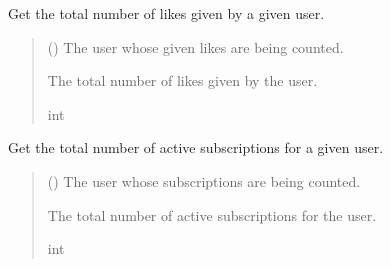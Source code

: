\documentclass[letterpaper,10pt,english]{sphinxmanual}
\begin{document}

\begin{fulllineitems}
\label{\detokenize{modules/others:account.helpers.get_total_likes_given}}
\pysigstartsignatures
{}
\pysigstopsignatures
\sphinxAtStartPar
Get the total number of likes given by a given user.
\begin{quote}\begin{description}
\sphinxAtStartPar
{} ({\hyperref[\detokenize{modules/models:account.models.CustomUser}]{}}) \textendash{} The user whose given likes are being counted.

\sphinxAtStartPar
The total number of likes given by the user.

\sphinxAtStartPar
int

\end{description}\end{quote}

\end{fulllineitems}


\begin{fulllineitems}
\label{\detokenize{modules/others:account.helpers.get_total_subscriptions}}
\pysigstartsignatures
{}
\pysigstopsignatures
\sphinxAtStartPar
Get the total number of active subscriptions for a given user.
\begin{quote}\begin{description}
\sphinxAtStartPar
{} ({\hyperref[\detokenize{modules/models:account.models.CustomUser}]{}}) \textendash{} The user whose subscriptions are being counted.

\sphinxAtStartPar
The total number of active subscriptions for the user.

\sphinxAtStartPar
int

\end{description}\end{quote}

\end{fulllineitems}
\end{document}

